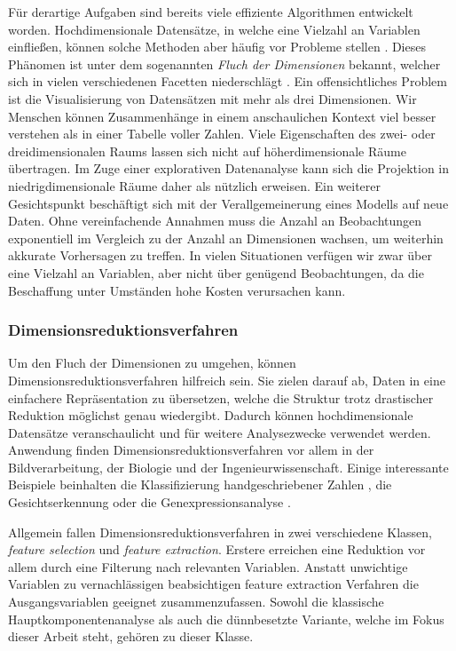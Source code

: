 Für derartige Aufgaben sind bereits viele effiziente Algorithmen entwickelt worden. Hochdimensionale Datensätze, in welche eine Vielzahl an Variablen einfließen, können solche Methoden aber häufig vor Probleme stellen \cite{donoho_high, donoho_observed}. Dieses Phänomen ist unter dem sogenannten \textit{Fluch der Dimensionen} bekannt, welcher sich in vielen verschiedenen Facetten niederschlägt \cite{bellman}. Ein offensichtliches Problem ist die Visualisierung von Datensätzen mit mehr als drei Dimensionen. Wir Menschen können Zusammenhänge in einem anschaulichen Kontext viel besser verstehen als in einer Tabelle voller Zahlen. Viele Eigenschaften des zwei- oder dreidimensionalen Raums lassen sich nicht auf höherdimensionale Räume übertragen. Im Zuge einer explorativen Datenanalyse kann sich die Projektion in niedrigdimensionale Räume daher als nützlich erweisen. Ein weiterer Gesichtspunkt beschäftigt sich mit der Verallgemeinerung eines Modells auf neue Daten. Ohne vereinfachende Annahmen muss die Anzahl an Beobachtungen exponentiell im Vergleich zu der Anzahl an Dimensionen wachsen, um weiterhin akkurate Vorhersagen zu treffen. In vielen Situationen verfügen wir zwar über eine Vielzahl an Variablen, aber nicht über genügend Beobachtungen, da die Beschaffung unter Umständen hohe Kosten verursachen kann. 




\subsubsection{Dimensionsreduktionsverfahren}

Um den Fluch der Dimensionen zu umgehen, können Dimensionsreduktionsverfahren hilfreich sein. Sie zielen darauf ab, Daten in eine einfachere Repräsentation zu übersetzen, welche die Struktur trotz drastischer Reduktion möglichst genau wiedergibt. Dadurch können hochdimensionale Datensätze veranschaulicht und für weitere Analysezwecke verwendet werden. Anwendung finden Dimensionsreduktionsverfahren vor allem in der Bildverarbeitung, der Biologie und der Ingenieurwissenschaft. Einige interessante Beispiele beinhalten die Klassifizierung handgeschriebener Zahlen \cite{hastie_elements}, die Gesichtserkennung \cite{hancock} oder die Genexpressionsanalyse \cite{alter}.

Allgemein fallen Dimensionsreduktionsverfahren in zwei verschiedene Klassen, \textit{feature selection} und \textit{feature extraction}. Erstere erreichen eine Reduktion vor allem durch eine Filterung nach relevanten Variablen. Anstatt unwichtige Variablen zu vernachlässigen beabsichtigen feature extraction Verfahren die Ausgangsvariablen geeignet zusammenzufassen. Sowohl die klassische Hauptkomponentenanalyse als auch die dünnbesetzte Variante, welche im Fokus dieser Arbeit steht, gehören zu dieser Klasse.


